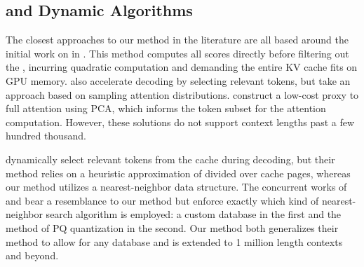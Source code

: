 \subsection{\Topk and Dynamic Algorithms}
The closest approaches to our method in the literature are all based around the initial work on \topk in \citet{guptaMemoryefficientTransformersTopk2021}. This method computes all scores directly before filtering out the \topk, incurring quadratic computation and demanding the entire KV cache fits on GPU memory. \citet{chen2024magicpiglshsamplingefficient} also accelerate decoding by selecting relevant tokens, but take an approach based on sampling attention distributions. 
\citet{singhania2024lokilowrankkeysefficient} construct a low-cost proxy to full attention using PCA, which informs the token subset for the attention computation. 
However, these solutions do not support context lengths past a few hundred thousand.

\citet{tang2024questqueryawaresparsityefficient} dynamically select relevant tokens from the cache during decoding, but their method relies on a heuristic approximation of \topk divided over cache pages, whereas our method utilizes a nearest-neighbor data structure.
 The concurrent works of \citep{liu2024retrievalattentionacceleratinglongcontextllm} and \citep{zhang2024pqcacheproductquantizationbasedkvcache} bear a resemblance to our method but enforce exactly which kind of nearest-neighbor search algorithm is employed: a custom database in the first and the method of PQ quantization in the second. Our method both generalizes their method to allow for any database and is extended to 1 million length contexts and beyond.



